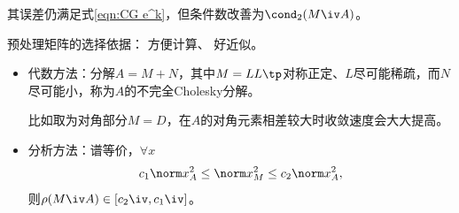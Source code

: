 \begin{corollary}
    其误差仍满足式\eqref{eqn:CG e^k}，但条件数改善为$\cond_2(M\iv A)$。
\end{corollary}

\begin{remark}
    预处理矩阵的选择依据：
    方便计算、
    好近似。
    \begin{itemize}
        \item 代数方法：分解$A=M+N$，其中$M=LL\tp$对称正定、$L$尽可能稀疏，而$N$尽可能小，称为$A$的不完全Cholesky分解。
        
        比如取为对角部分$M=D$，在$A$的对角元素相差较大时收敛速度会大大提高。
        \item 分析方法：谱等价，$\forall x$
        \[
            c_1\norm x_A^2\leq\norm x_M^2\leq c_2\norm x_A^2,
        \]
        则$\rho(M\iv A)\in[c_2\iv,c_1\iv]$。
    \end{itemize}
\end{remark}